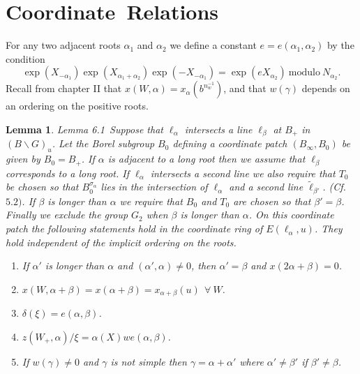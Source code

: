 \documentclass{memo-l}
\newtheorem{lemma}[theorem]{Lemma}
\theoremstyle{definition}
\theoremstyle{remark}
\numberwithin{section}{chapter}
\numberwithin{equation}{chapter}
\begin{document}
\section{Coordinate\ Relations}


   For any two adjacent roots ${\alpha}_{1}$ and ${\alpha}_{2}$ we define a
constant $e = e({\alpha}_{1},{\alpha}_{2})$ by the condition
$$
\exp(X_{-{\alpha}_{1}})\exp(X_{{\alpha}_{1}+{\alpha}_{2}})
\exp(-X_{-{\alpha}_{1}}) = \exp(eX_{{\alpha}_{2}})\ {\text{modulo}}\
N_{{\alpha}_{2}}.
$$
Recall from chapter II that $x(W,{\alpha}) = x_{{\alpha}}(b^{n_{w}^{-1}})$,
and that $w({\gamma})$ depends on an ordering on the
positive roots.

\medpagebreak

\begin{lemma}{Lemma 6.1}\ Suppose that ${\ell}_{{\alpha}}$ intersects a
line ${\ell}_{{\beta}}$ at $B_{+}$ in $(B\backslash G)_{u}$.  Let the Borel
subgroup $B_{0}$ defining a coordinate patch $(B_{{\infty}},B_{0})$ be
given by $B_{0} = B_{+}$.  If ${\alpha}$ is adjacent to a long root then we
assume that ${\ell}_{{\beta}}$ corresponds to a long root.  If
${\ell}_{{\alpha}}$ intersects a second line we also require that $T_{0}$
be chosen so that $B_{0}^{{\sigma}_{{\alpha}}}$ lies in the
intersection of ${\ell}_{{\alpha}}$ and a second line $\tilde{\ell}
_{{\beta}'}$.  (Cf.  $5.2)$.  If ${\beta}$ is longer than ${\alpha}$ we
require that $B_{0}$ and $T_{0}$ are chosen so that ${\beta}'={\beta}$.
Finally we exclude the group $G_{2}$ when ${\beta}$ is longer than
${\alpha}$.  On this coordinate patch the following statements hold in the
coordinate ring of $E({\ell}_{{\alpha}},u)$.  They hold independent of
the implicit ordering on the roots.

\smallskip
\begin{enumerate}[label=\alph*)]
\item If ${\alpha}'$ is longer than ${\alpha}$ and $({\alpha}',{\alpha}) \ne
0$, then ${\alpha}' = {\beta}$ and $x(2{\alpha}+{\beta}) = 0$.

\item
$x(W,{\alpha}+{\beta}) = x({\alpha}+{\beta}) = x_{{\alpha}+{\beta}}(u)\
{\ \forall\ } W$.

\item
${\delta}({\xi}) = e({\alpha},{\beta})$.

\item
$z(W_{+},{\alpha})/{\xi} = {\alpha}(X)we({\alpha},{\beta})$.

\item
If $w({\gamma})\ne 0$ and ${\gamma}$ is not simple then
${\gamma} = {\alpha}+{\alpha}'$ where ${\alpha}' \ne {\beta}'$ if ${\beta}' \ne
{\beta}$.


\end{enumerate}
\end{lemma}
\end{document}
